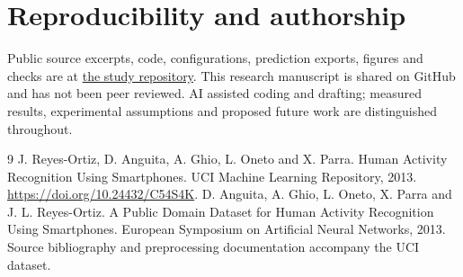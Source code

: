 \documentclass[11pt]{article}
\begin{document}
\section*{Reproducibility and authorship}
Public source excerpts, code, configurations, prediction exports, figures and checks are at \href{https://github.com/S3R3Bii/sensor-loss-abstention}{the study repository}. This research manuscript is shared on GitHub and has not been peer reviewed. AI assisted coding and drafting; measured results, experimental assumptions and proposed future work are distinguished throughout.
\begingroup\small\begin{thebibliography}{9}\setlength{\itemsep}{2pt}
 J. Reyes-Ortiz, D. Anguita, A. Ghio, L. Oneto and X. Parra. Human Activity Recognition Using Smartphones. UCI Machine Learning Repository, 2013. \url{https://doi.org/10.24432/C54S4K}.
 D. Anguita, A. Ghio, L. Oneto, X. Parra and J. L. Reyes-Ortiz. A Public Domain Dataset for Human Activity Recognition Using Smartphones. European Symposium on Artificial Neural Networks, 2013. Source bibliography and preprocessing documentation accompany the UCI dataset.
\end{thebibliography}\endgroup
\end{document}
